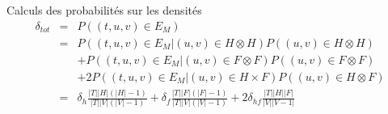 \documentclass[15pt]{beamer}
\begin{document}
\begin{frame}{Calculs des probabilités sur les densités}
    \begin{align*}
        \delta_{tot}&=&P((t,u,v) \in E_M)\\
        &= &P((t,u,v) \in E_M | (u,v) \in H\otimes H)P((u,v)\in H\otimes H) \\
        &&+ P((t,u,v) \in E_M | (u,v) \in F\otimes F)P((u,v)\in F\otimes F) \\
        &&+2P((t,u,v) \in E_M | (u,v) \in H\times F)P((u,v)\in H\otimes F)\\
        &=& \delta_h \frac{|T||H|(|H|-1)}{|T||V|(|V|-1)} + \delta_f \frac{|T||F|(|F|-1)}{|T||V|(|V|-1)} + 2 \delta_{hf} \frac{|T||H||F|}{|V||V-1|} 
    \end{align*}  
\end{frame}
\end{document}
